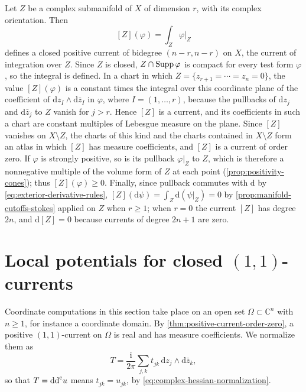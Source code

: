 \begin{example}\label{ex:submanifold-current}
Let $Z$ be a complex submanifold of $X$ of dimension $r$, with its complex orientation. Then
\[
 [Z](\varphi)=\int_Z\varphi|_Z
\]
defines a closed positive current of bidegree $(n-r,n-r)$ on $X$, the current of integration over $Z$. Since $Z$ is closed, $Z\cap\operatorname{Supp}\varphi$ is compact for every test form $\varphi$, so the integral is defined. In a chart in which $Z=\{z_{r+1}=\cdots=z_n=0\}$, the value $[Z](\varphi)$ is a constant times the integral over this coordinate plane of the coefficient of $\mathrm dz_I\wedge\mathrm d\bar z_I$ in $\varphi$, where $I=(1,\ldots,r)$, because the pullbacks of $\mathrm dz_j$ and $\mathrm d\bar z_j$ to $Z$ vanish for $j>r$. Hence $[Z]$ is a current, and its coefficients in such a chart are constant multiples of Lebesgue measure on the plane. Since $[Z]$ vanishes on $X\setminus Z$, the charts of this kind and the charts contained in $X\setminus Z$ form an atlas in which $[Z]$ has measure coefficients, and $[Z]$ is a current of order zero. If $\varphi$ is strongly positive, so is its pullback $\varphi|_Z$ to $Z$, which is therefore a nonnegative multiple of the volume form of $Z$ at each point (\cref{prop:positivity-cones}); thus $[Z](\varphi)\geq0$. Finally, since pullback commutes with $\mathrm d$ by \eqref{eq:exterior-derivative-rules}, $[Z](\mathrm d\psi)=\int_Z\mathrm d(\psi|_Z)=0$ by \cref{prop:manifold-cutoffs-stokes} applied on $Z$ when $r\geq1$; when $r=0$ the current $[Z]$ has degree $2n$, and $\mathrm d[Z]=0$ because currents of degree $2n+1$ are zero.
\end{example}

\section{Local potentials for closed \texorpdfstring{$(1,1)$}{(1,1)}-currents}
\label{sec:local-complex-potentials}

Coordinate computations in this section take place on an open set $\Omega\subset\mathbb C^n$ with $n\geq1$, for instance a coordinate domain. By \cref{thm:positive-current-order-zero}, a positive $(1,1)$-current on $\Omega$ is real and has measure coefficients. We normalize them as
\[
 T=\frac{\mathrm{i}}{2\pi}\sum_{j,k}t_{j\bar k}\,\mathrm{d}z_j\wedge\mathrm{d}\bar z_k,
\]
so that $T=\mathrm{dd}^{\mathrm{c}} u$ means $t_{j\bar k}=u_{j\bar k}$, by \eqref{eq:complex-hessian-normalization}.

